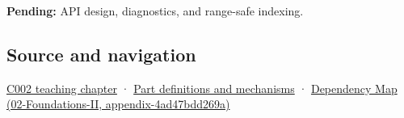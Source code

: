 \textbf{Pending:} API design, diagnostics, and range-safe indexing.

\subsection{Source and navigation}\label{appendix-736a2345de4a-source-and-navigation}

\hyperref[01-foundations-i-ch001-arithmetic-becomes-a-policy]{C002 teaching chapter} · \hyperref[appendix-fd090d982a15]{Part definitions and mechanisms} · \href{../02-Foundations-II/main.pdf\#nameddest=appendix-4ad47bdd269a}{Dependency Map (02-Foundations-II, appendix-4ad47bdd269a)}
